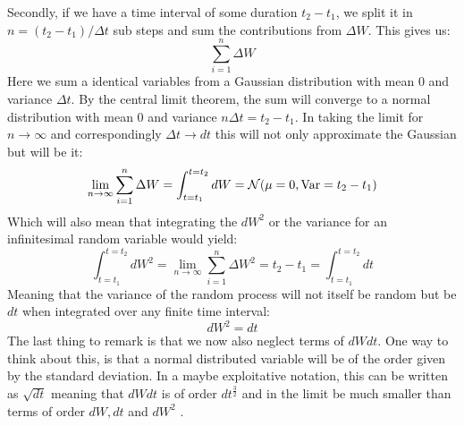 Secondly, if we have a time interval of some duration $t_2 - t_1$, we split it in $n = (t_2 - t_1)/\Delta t$ sub steps and sum the contributions from $\Delta W$. This gives us:
\begin{equation}
    \sum_{i=1}^n \Delta W
\end{equation}
Here we sum a identical variables from a Gaussian distribution with mean $0$ and variance $\Delta t$. By the central limit theorem, the sum will converge to a normal distribution with mean $0$ and variance $n \Delta{t} = t_2 - t_1$. In taking the limit for $n \to \infty$ and correspondingly $\Delta t \to dt$ this will not only approximate the Gaussian but will be it:
\begin{equation}
    \lim_{n \to \infty} \sum_{i=1}^n \Delta W = \int_{t = t_1}^{t = t_2} dW = \mathcal{N}(\mu = 0, \operatorname{Var} = t_2 - t_1)
\end{equation}
Which will also mean that integrating the $dW^2$ or the variance for an infinitesimal random variable would yield:
\begin{equation}
    \int_{t = t_1}^{t = t_2} dW^2 =  \lim_{n \to \infty} \sum_{i=1}^n \Delta W^2 = t_2 - t_1 = \int_{t = t_1}^{t = t_2} dt
\end{equation}
Meaning that the variance of the random process will not itself be random but be $dt$ when integrated over any finite time interval: 
\begin{equation}
    dW^2 = dt
\end{equation}
The last thing to remark is that we now also neglect terms of $dWdt$. One way to think about this, is that a normal distributed variable will be of the order given by the standard deviation. In a maybe exploitative notation, this can be written as $\sqrt{dt}$ meaning that $dWdt$ is of order $dt^\frac32$ and in the limit be much smaller than terms of order $dW, dt$ and $dW^2$ \cite{Gheorghiu}.





